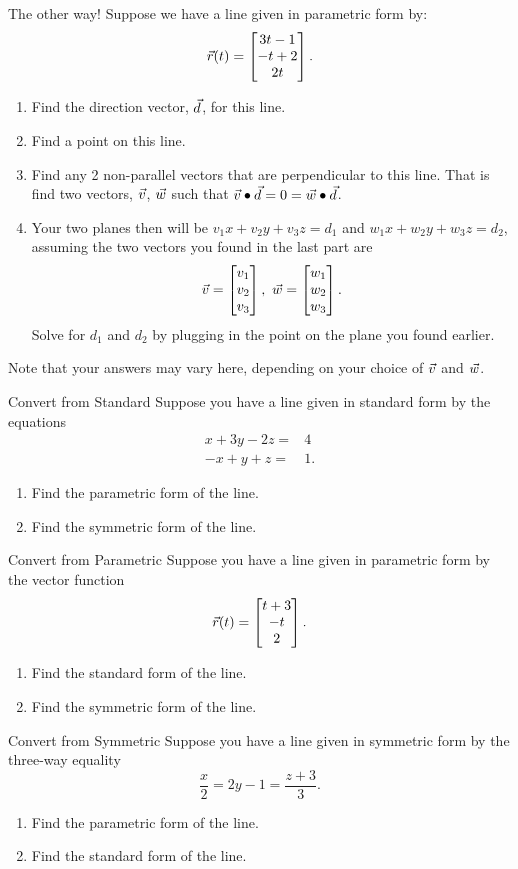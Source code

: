 \begin{exercise}{The other way!}
Suppose we have a line given in parametric form by:
$$\vec{r}(t)=\begin{bmatrix}3t-1\\-t+2\\2t\end{bmatrix}.$$
\begin{enumerate}
\item Find the direction vector, $\vec{d}$, for this line.
\vspace{1em}
\item Find a point on this line.
\vspace{1em}
\item Find any 2 non-parallel vectors that are perpendicular to this line. That is find two vectors, $\vec{v}$, $\vec{w}$ such that $\vec{v}\bullet\vec{d}=0=\vec{w}\bullet\vec{d}$.
\vspace{1em}
\item Your two planes then will be $v_1x+v_2y+v_3z=d_1$ and $w_1x+w_2y+w_3z=d_2$, assuming the two vectors you found in the last part are $$\vcv=\bmat{v_1\\v_2\\v_3},\ \vcw=\bmat{w_1\\w_2\\w_3}.$$ Solve for $d_1$ and $d_2$ by plugging in the point on the plane you found earlier.
\vspace{1em}
\end{enumerate}
Note that your answers may vary here, depending on your choice of $\vec{v}$ and $\vec{w}$.
\end{exercise}

\begin{exercise}{Convert from Standard}
Suppose you have a line given in standard form by the equations 
\begin{align*}
x+3y-2z=&4\\
-x+y+z=&1.
\end{align*}
\begin{enumerate}
\item Find the parametric form of the line.
\vspace{1em}
\item Find the symmetric form of the line.
\end{enumerate}
\end{exercise}

\begin{exercise}{Convert from Parametric}
Suppose you have a line given in parametric form by the vector function
$$\vec{r}(t)=\begin{bmatrix}t+3\\-t\\2\end{bmatrix} .$$
\begin{enumerate}
\item Find the standard form of the line.
\vspace{1em}
\item Find the symmetric form of the line.
\end{enumerate}
\end{exercise}

\begin{exercise}{Convert from Symmetric}
Suppose you have a line given in symmetric form by the three-way equality
$$\frac{x}{2}=2y-1=\frac{z+3}{3}.$$
\begin{enumerate}
\item Find the parametric form of the line.
\vspace{1em}
\item Find the standard form of the line.
\end{enumerate}
\end{exercise}